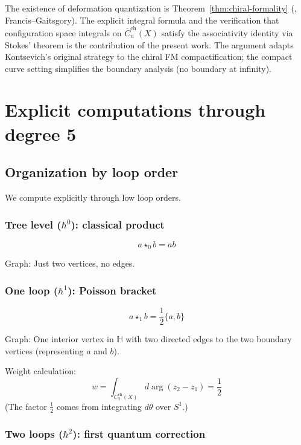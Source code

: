 \begin{remark}[Provenance]
The existence of deformation quantization is
Theorem~\ref{thm:chiral-formality} (\ClaimStatusProvedElsewhere,
Francis--Gaitsgory).  The explicit integral formula and the
verification that configuration space integrals on $\overline{C}_n^{\mathrm{ch}}(X)$
satisfy the associativity identity via Stokes' theorem is the
contribution of the present work.  The argument adapts Kontsevich's
original strategy \cite{Kon03} to the chiral FM compactification;
the compact curve setting simplifies the boundary analysis
(no boundary at infinity).
\end{remark}

\section{Explicit computations through degree 5}

\subsection{Organization by loop order}

We compute explicitly through low loop orders.

\subsubsection{\texorpdfstring{Tree level ($\hbar^0$): classical product}{Tree level (0): classical product}}

\[a \star_0 b = ab\]

Graph: Just two vertices, no edges.

\subsubsection{\texorpdfstring{One loop ($\hbar^1$): Poisson bracket}{One loop (1): Poisson bracket}}

\[a \star_1 b = \frac{1}{2}\{a, b\}\]

Graph: One interior vertex in $\mathbb{H}$ with two directed edges to the two boundary vertices (representing $a$ and $b$).

Weight calculation:
\[w = \int_{C_2^{\text{ch}}(X)} d\arg(z_2 - z_1) = \frac{1}{2}\]
(The factor $\frac{1}{2}$ comes from integrating $d\theta$ over $S^1$.)

\subsubsection{\texorpdfstring{Two loops ($\hbar^2$): first quantum correction}{Two loops (2): first quantum correction}}

